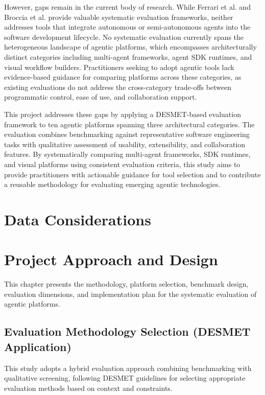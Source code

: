 \documentclass[]
{UCD_CS_FYP_Report}
\begin{document}
However, gaps remain in the current body of research. While Ferrari et al. and Broccia et al. provide valuable systematic evaluation frameworks, neither addresses tools that integrate autonomous or semi-autonomous agents into the software development lifecycle. No systematic evaluation currently spans the heterogeneous landscape of agentic platforms, which encompasses architecturally distinct categories including multi-agent frameworks, agent SDK runtimes, and visual workflow builders. Practitioners seeking to adopt agentic tools lack evidence-based guidance for comparing platforms across these categories, as existing evaluations do not address the cross-category trade-offs between programmatic control, ease of use, and collaboration support.

This project addresses these gaps by applying a DESMET-based evaluation framework to ten agentic platforms spanning three architectural categories. The evaluation combines benchmarking against representative software engineering tasks with qualitative assessment of usability, extensibility, and collaboration features. By systematically comparing multi-agent frameworks, SDK runtimes, and visual platforms using consistent evaluation criteria, this study aims to provide practitioners with actionable guidance for tool selection and to contribute a reusable methodology for evaluating emerging agentic technologies.

\chapter{Data Considerations}



\chapter{Project Approach and Design}

This chapter presents the methodology, platform selection, benchmark design, evaluation dimensions, and implementation plan for the systematic evaluation of agentic platforms.

\section{Evaluation Methodology Selection (DESMET Application)}

This study adopts a hybrid evaluation approach combining benchmarking with qualitative screening, following DESMET guidelines for selecting appropriate evaluation methods based on context and constraints.
\end{document}
